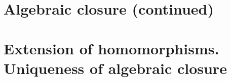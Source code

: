 \section{Algebraic closure (continued)}

\section{Extension of homomorphisms. Uniqueness of algebraic closure}
